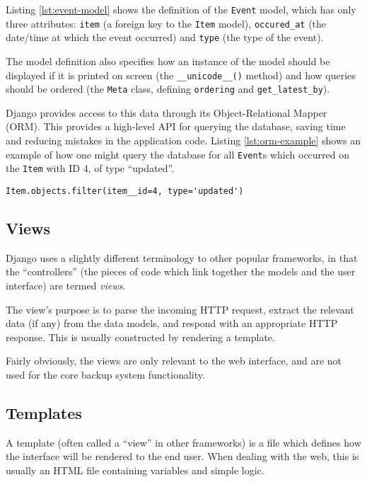 Listing \ref{lst:event-model} shows the definition of the \verb!Event! model,
which has only three attributes: \verb!item! (a foreign key to the \verb!Item!
model), \verb!occured_at! (the date/time at which the event occurred) and
\verb!type! (the type of the event).

The model definition also specifies how an instance of the model should be
displayed if it is printed on screen (the \verb!__unicode__()! method) and how
queries should be ordered (the \verb!Meta! class, defining \verb!ordering!
and \verb!get_latest_by!).

Django provides access to this data through its Object-Relational Mapper (ORM).
This provides a high-level API for querying the database, saving time and
reducing mistakes in the application code. Listing \ref{lst:orm-example} shows
an example of how one might query the database for all \verb!Event!s which
occurred on the \verb!Item! with ID 4, of type ``updated''.

\begin{singlespacing}
\begin{lstlisting}[caption=Querying for all ``updated'' Events on Item 4,
    label=lst:orm-example]
    Item.objects.filter(item__id=4, type='updated')
\end{lstlisting}
\end{singlespacing}

\subsection{Views}

Django uses a slightly different terminology to other popular frameworks, in
that the ``controllers'' (the pieces of code which link together the models and
the user interface) are termed \emph{views}.

The view's purpose is to parse the incoming HTTP request, extract the relevant
data (if any) from the data models, and respond with an appropriate HTTP
response. This is usually constructed by rendering a template.

Fairly obviously, the views are only relevant to the web interface, and are not
used for the core backup system functionality.

\subsection{Templates}

A template (often called a ``view'' in other frameworks) is a file which
defines how the interface will be rendered to the end user. When dealing with
the web, this is usually an HTML file containing variables and simple logic.

